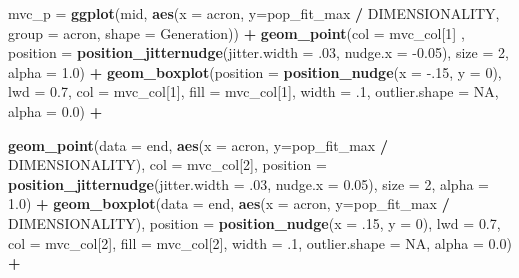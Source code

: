 \documentclass[]{book}
\newenvironment{Shaded}{\begin{snugshade}}{\end{snugshade}}
\newcommand{\DataTypeTok}[1]{\textcolor[rgb]{0.13,0.29,0.53}{#1}}
\newcommand{\DecValTok}[1]{\textcolor[rgb]{0.00,0.00,0.81}{#1}}
\newcommand{\FloatTok}[1]{\textcolor[rgb]{0.00,0.00,0.81}{#1}}
\newcommand{\KeywordTok}[1]{\textcolor[rgb]{0.13,0.29,0.53}{\textbf{#1}}}
\newcommand{\NormalTok}[1]{#1}
\newcommand{\OperatorTok}[1]{\textcolor[rgb]{0.81,0.36,0.00}{\textbf{#1}}}
\newcommand{\OtherTok}[1]{\textcolor[rgb]{0.56,0.35,0.01}{#1}}
\newcommand{\StringTok}[1]{\textcolor[rgb]{0.31,0.60,0.02}{#1}}
\begin{document}
\begin{Shaded}
\begin{Highlighting}[]
{\NormalTok{mvc_p =}\StringTok{ }\KeywordTok{ggplot}\NormalTok{(mid, }\KeywordTok{aes}\NormalTok{(}\DataTypeTok{x =}\NormalTok{ acron, }\DataTypeTok{y=}\NormalTok{pop_fit_max }\OperatorTok{/}\StringTok{ }\NormalTok{DIMENSIONALITY, }\DataTypeTok{group =}\NormalTok{ acron, }\DataTypeTok{shape =}\NormalTok{ Generation)) }\OperatorTok{+}
\StringTok{          }\KeywordTok{geom_point}\NormalTok{(}\DataTypeTok{col =}\NormalTok{ mvc_col[}\DecValTok{1}\NormalTok{] , }\DataTypeTok{position =} \KeywordTok{position_jitternudge}\NormalTok{(}\DataTypeTok{jitter.width =} \FloatTok{.03}\NormalTok{, }\DataTypeTok{nudge.x =} \FloatTok{-0.05}\NormalTok{), }\DataTypeTok{size =} \DecValTok{2}\NormalTok{, }\DataTypeTok{alpha =} \FloatTok{1.0}\NormalTok{) }\OperatorTok{+}
\StringTok{          }\KeywordTok{geom_boxplot}\NormalTok{(}\DataTypeTok{position =} \KeywordTok{position_nudge}\NormalTok{(}\DataTypeTok{x =} \FloatTok{-.15}\NormalTok{, }\DataTypeTok{y =} \DecValTok{0}\NormalTok{), }\DataTypeTok{lwd =} \FloatTok{0.7}\NormalTok{, }\DataTypeTok{col =}\NormalTok{ mvc_col[}\DecValTok{1}\NormalTok{], }\DataTypeTok{fill =}\NormalTok{ mvc_col[}\DecValTok{1}\NormalTok{], }\DataTypeTok{width =} \FloatTok{.1}\NormalTok{, }\DataTypeTok{outlier.shape =} \OtherTok{NA}\NormalTok{, }\DataTypeTok{alpha =} \FloatTok{0.0}\NormalTok{) }\OperatorTok{+}

\StringTok{          }\KeywordTok{geom_point}\NormalTok{(}\DataTypeTok{data =}\NormalTok{ end, }\KeywordTok{aes}\NormalTok{(}\DataTypeTok{x =}\NormalTok{ acron, }\DataTypeTok{y=}\NormalTok{pop_fit_max }\OperatorTok{/}\StringTok{ }\NormalTok{DIMENSIONALITY), }\DataTypeTok{col =}\NormalTok{ mvc_col[}\DecValTok{2}\NormalTok{], }\DataTypeTok{position =} \KeywordTok{position_jitternudge}\NormalTok{(}\DataTypeTok{jitter.width =} \FloatTok{.03}\NormalTok{, }\DataTypeTok{nudge.x =} \FloatTok{0.05}\NormalTok{), }\DataTypeTok{size =} \DecValTok{2}\NormalTok{, }\DataTypeTok{alpha =} \FloatTok{1.0}\NormalTok{) }\OperatorTok{+}
\StringTok{          }\KeywordTok{geom_boxplot}\NormalTok{(}\DataTypeTok{data =}\NormalTok{ end, }\KeywordTok{aes}\NormalTok{(}\DataTypeTok{x =}\NormalTok{ acron, }\DataTypeTok{y=}\NormalTok{pop_fit_max }\OperatorTok{/}\StringTok{ }\NormalTok{DIMENSIONALITY), }\DataTypeTok{position =} \KeywordTok{position_nudge}\NormalTok{(}\DataTypeTok{x =} \FloatTok{.15}\NormalTok{, }\DataTypeTok{y =} \DecValTok{0}\NormalTok{), }\DataTypeTok{lwd =} \FloatTok{0.7}\NormalTok{, }\DataTypeTok{col =}\NormalTok{ mvc_col[}\DecValTok{2}\NormalTok{], }\DataTypeTok{fill =}\NormalTok{ mvc_col[}\DecValTok{2}\NormalTok{], }\DataTypeTok{width =} \FloatTok{.1}\NormalTok{, }\DataTypeTok{outlier.shape =} \OtherTok{NA}\NormalTok{, }\DataTypeTok{alpha =} \FloatTok{0.0}\NormalTok{) }\OperatorTok{+}

}
\end{Highlighting}
\end{Shaded}
\end{document}
